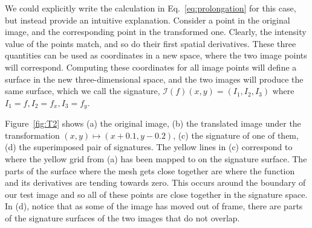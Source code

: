 \documentclass[review,onefignum,onetabnum]{siamonline190516}
\begin{document}
We could explicitly write the calculation in Eq.~\ref{eq:prolongation} for
this case, but instead provide an intuitive explanation. Consider a point
in the original image, and the corresponding point in the transformed one.
Clearly, the intensity value of the points match, and so do their first
spatial derivatives. These three quantities can be used as coordinates in a
new space, where the two image points will correspond. Computing these
coordinates for all image points will define a surface in the new
three-dimensional space, and the two images will produce the same surface,
which we call the signature, $\mathcal{I}(f)(x, y) = \left(I_1, I_2,
I_3\right)$ where $I_1 = f, I_2 = f_x, I_3 = f_y$.

Figure~\ref{fig:T2} shows (a) the original image, (b) the translated image
under the transformation $(x,y) \mapsto (x + 0.1, y - 0.2)$, (c) the
signature of one of them, (d) the superimposed pair of signatures. The
yellow lines in (c) correspond to where the yellow grid from (a) has been
mapped to on the signature surface. The parts of the surface where the mesh
gets close together are where the function and its derivatives are tending
towards zero. This occurs around the boundary of our test image and so all
of these points are close together in the signature space. In (d), notice
that as some of the image has moved out of frame, there are parts of the
signature surfaces of the two images that do not overlap.
\end{document}
